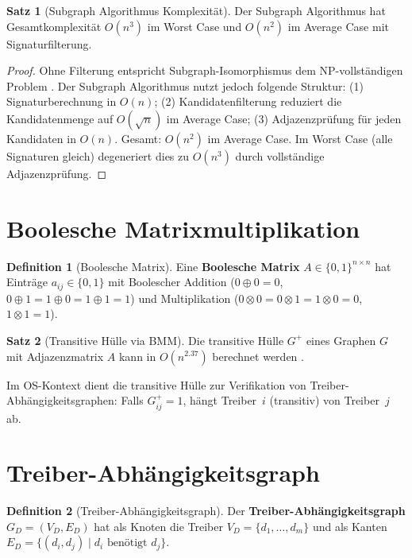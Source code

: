 ﻿\documentclass[a4paper,12pt]{scrreprt}
\theoremstyle{definition}
\newtheorem{definition}{Definition}[chapter]
\newtheorem{satz}{Satz}[chapter]
\begin{document}
	\begin{satz}[Subgraph Algorithmus Komplexität]\label{satz:subgraph_comp}
		Der Subgraph Algorithmus hat Gesamtkomplexität $O(n^3)$ im Worst Case
		und $O(n^2)$ im Average Case mit Signaturfilterung.
	\end{satz}
	
	\begin{proof}
		Ohne Filterung entspricht Subgraph-Isomorphismus dem NP-vollständigen
		Problem \cite{Cook1971}. Der Subgraph Algorithmus nutzt jedoch folgende
		Struktur: (1) Signaturberechnung in $O(n)$; (2) Kandidatenfilterung
		reduziert die Kandidatenmenge auf $O(\sqrt{n})$ im Average Case;
		(3) Adjazenzprüfung für jeden Kandidaten in $O(n)$. Gesamt: $O(n^2)$
		im Average Case. Im Worst Case (alle Signaturen gleich) degeneriert
		dies zu $O(n^3)$ durch vollständige Adjazenzprüfung.
	\end{proof}
	
	\section{Boolesche Matrixmultiplikation}
	
	\begin{definition}[Boolesche Matrix]
		Eine \textbf{Boolesche Matrix} $A \in \{0,1\}^{n \times n}$ hat
		Einträge $a_{ij} \in \{0,1\}$ mit Boolescher Addition
		($0 \oplus 0 = 0$, $0 \oplus 1 = 1 \oplus 0 = 1 \oplus 1 = 1$)
		und Multiplikation ($0 \otimes 0 = 0 \otimes 1 = 1 \otimes 0 = 0$,
		$1 \otimes 1 = 1$).
	\end{definition}
	
	\begin{satz}[Transitive Hülle via BMM]\label{satz:bmm}
		Die transitive Hülle $G^+$ eines Graphen $G$ mit Adjazenzmatrix $A$
		kann in $O(n^{2.37})$ berechnet werden \cite{Epp2026boolmm}.
	\end{satz}
	
	Im OS-Kontext dient die transitive Hülle zur Verifikation von
	Treiber-Abhängigkeitsgraphen: Falls $G^+_{ij} = 1$, hängt Treiber~$i$
	(transitiv) von Treiber~$j$ ab.
	
	\section{Treiber-Abhängigkeitsgraph}
	
	\begin{definition}[Treiber-Abhängigkeitsgraph]
		Der \textbf{Treiber-Abhängigkeitsgraph} $G_D = (V_D, E_D)$ hat als
		Knoten die Treiber $V_D = \{d_1, \ldots, d_m\}$ und als Kanten
		$E_D = \{(d_i, d_j) \mid d_i \text{ benötigt } d_j\}$.
	\end{definition}
	
\end{document}

